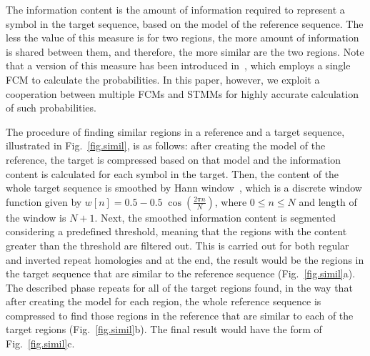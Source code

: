 The information content is the amount of information required to represent a symbol in the target sequence, based on the model of the reference sequence. The less the value of this measure is for two regions, the more amount of information is shared between them, and therefore, the more similar are the two regions. Note that a version of this measure has been introduced in~\cite{pratas2015alignment}, which employs a single FCM to calculate the probabilities. In this paper, however, we exploit a cooperation between multiple FCMs and STMMs for highly accurate calculation of such probabilities.

The procedure of finding similar regions in a reference and a target sequence, illustrated in Fig.~\ref{fig.simil}, is as follows: after creating the model of the reference, the target is compressed based on that model and the information content is calculated for each symbol in the target. Then, the content of the whole target sequence is smoothed by Hann window~\cite{blackman1959particular}, which is a discrete window function given by $w[n]=0.5-0.5\;\cos \left({\frac {2\pi n}{N}}\right)$, where $0\le n\le N$ and length of the window is $N+1$. Next, the smoothed information content is segmented considering a predefined threshold, meaning that the regions with the content greater than the threshold are filtered out. This is carried out for both regular and inverted repeat homologies and at the end, the result would be the regions in the target sequence that are similar to the reference sequence (Fig.~\ref{fig.simil}a). The described phase repeats for all of the target regions found, in the way that after creating the model for each region, the whole reference sequence is compressed to find those regions in the reference that are similar to each of the target regions (Fig.~\ref{fig.simil}b). The final result would have the form of Fig.~\ref{fig.simil}c.

